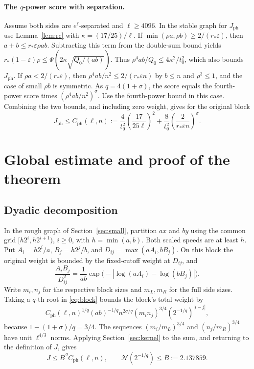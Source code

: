 \documentclass[11pt,a4paper]{article}
\begin{document}
\paragraph{The \(q\)-power score with separation.}
Assume both sides are \(e^\ell\)-separated and \(\ell\ge4096\).
In the stable graph for \(J_{\mathrm{ph}}\) use
Lemma~\ref{lem:rc} with \(\kappa=(17/25)/\ell\).
If \(\min(\rho a,\rho b)\ge2/(r_*\varepsilon)\), then
\(a+b\le r_*\varepsilon\rho ab\). Subtracting this term from
the double-sum bound yields
\(r_*(1-\varepsilon)\rho\le\Psi(2\kappa\sqrt{Q_0/(ab)})\).
Thus \(\rho^4 ab/Q_0\le4\kappa^2/t_0^2\), which also bounds
\(J_{\mathrm{ph}}\).
If \(\rho a<2/(r_*\varepsilon)\), then
\(\rho^4ab/n^2\le2/(r_*\varepsilon n)\) by \(b\le n\)
and \(\rho^3\le1\), and the case of small \(\rho b\) is symmetric.
As \(q=4(1+\sigma)\), the score equals the fourth-power score
times \((\rho^4ab/n^2)^\sigma\). Use the fourth-power bound in
this case. Combining the two bounds, and including zero weight,
gives for the original block
\begin{equation}
 J_{\mathrm{ph}}\le C_{\mathrm{ph}}(\ell,n):=
 \frac4{t_0^2}\left(\frac{17}{25\ell}\right)^2
 +\frac8{t_0^2}\left(\frac2{r_*\varepsilon n}\right)^\sigma .
 \label{eq:block}
\end{equation}

\section{Global estimate and proof of the theorem}

\subsection{Dyadic decomposition}

In the rough graph of Section~\ref{sec:small}, partition \(ax\)
and \(by\) using the common grid \([h2^i,h2^{i+1})\), \(i\ge0\),
with \(h=\min(a,b)\). Both scaled speeds are at least \(h\).
Put \(A_i=h2^i/a\), \(B_j=h2^j/b\), and
\(D_{ij}=\max(aA_i,bB_j)\). On this block the original weight
is bounded by the fixed-cutoff weight at \(D_{ij}\), and
\[
 \frac{A_i B_j}{D_{ij}^2}
 =\frac1{ab}\exp\bigl(-|\log(aA_i)-\log(bB_j)|\bigr).
\]
Write \(m_i,n_j\) for the respective block sizes and \(m_L,m_R\)
for the full side sizes. Taking a \(q\)-th root in \eqref{eq:block}
bounds the block's total weight by
\[
 C_{\mathrm{ph}}(\ell,n)^{1/q}(ab)^{-1/q}n^{2\sigma/q}
 (m_i n_j)^{3/4}(2^{-1/q})^{|i-j|},
\]
because \(1-(1+\sigma)/q=3/4\).
The sequences \((m_i/m_L)^{3/4}\) and \((n_j/m_R)^{3/4}\)
have unit \(\ell^{4/3}\) norms. Applying Section~\ref{sec:kernel}
to the sum, and returning to the definition of \(J\), gives
\[
 J\le \overline B^{\,q} C_{\mathrm{ph}}(\ell,n),
 \qquad \mathcal N(2^{-1/q})\le\overline B:=2.137859 .
\]
\end{document}
